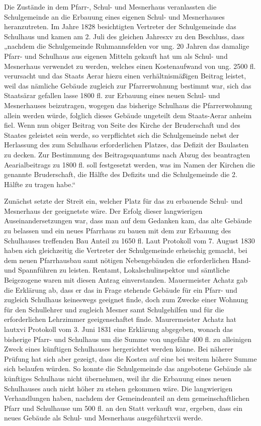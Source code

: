 \documentclass[12pt,a4paper]{book}
\begin{document}
Die Zustände in dem Pfarr-, Schul- und Mesnerhaus veranlassten die Schulgemeinde
an die Erbauung eines eigenen Schul- und Mesnerhauses heranzutreten. Im Jahre
1828 besichtigten Vertreter der Schulgemeinde das Schulhaus und kamen am 2. Juli
des gleichen Jahresxv zu den Beschluss, dass „nachdem die Schulgemeinde
Ruhmannsfelden vor ung. 20 Jahren das damalige Pfarr- und Schulhaus aus eigenen
Mitteln gekauft hat um als Schul- und Mesnerhaus verwendet zu werden, welches
einen Kostenaufwand von ung. 2500 fl. verursacht und das Staats Aerar hiezu
einen verhältnismäßigen Beitrag leistet, weil das nämliche Gebäude zugleich zur
Pfarrerwohnung bestimmt war, sich das Staatsärar gefallen lasse 1800 fl. zur
Erbauung eines neuen Schul- und Mesnerhauses beizutragen, wogegen das bisherige
Schulhaus die Pfarrerwohnung allein werden würde, folglich dieses Gebäude
ungeteilt dem Staats-Aerar anheim fiel. Wenn nun obiger Beitrag von Seite des
Kirche der Bruderschaft und des Staates geleistet sein werde, so verpflichtet
sich die Schulgemeinde nebst der Herlassung des zum Schulhaus erforderlichen
Platzes, das Defizit der Baulasten zu decken. Zur Bestimmung des
Beitragsquantums nach Abzug des beantragten Aearialbeitrags zu 1800 fl. soll
festgesetzt werden, was im Namen der Kirchen die genannte Bruderschaft, die
Hälfte des Defizits und die Schulgemeinde die 2. Hälfte zu tragen habe.“

Zunächst setzte der Streit ein, welcher Platz für das zu erbauende Schul- und
Mesnerhaus der geeignetste wäre. Der Erfolg dieser langwierigen
Auseinandersetzungen war, dass man auf dem Gedanken kam, das alte Gebäude zu
belassen und ein neues Pfarrhaus zu bauen mit dem zur Erbauung des Schulhauses
treffenden Bau Anteil zu 1650 fl. Laut Protokoll vom 7. August 1830 haben sich
gleichzeitig die Vertreter der Schulgemeinde erheischig gemacht, bei dem neuen
Pfarrhausbau samt nötigen Nebengebäuden die erforderlichen Hand- und Spannführen
zu leisten. Rentamt, Lokalschulinspektor und sämtliche Beigezogene waren mit
diesen Antrag einverstanden. Mauermeister Achatz gab die Erklärung ab, dass er
das in Frage stehende Gebäude für ein Pfarr- und zugleich Schulhaus keineswegs
geeignet finde, doch zum Zwecke einer Wohnung für den Schullehrer und zugleich
Mesner samt Schulgehilfen und für die erforderlichen Lehrzimmer geeigenschaftet
finde. Maurermeister Achatz hat lautxvi Protokoll vom 3. Juni 1831 eine
Erklärung abgegeben, wonach das bisherige Pfarr- und Schulhaus um die Summe von
ungefähr 400 fl. zu alleinigen Zweck eines künftigen Schulhauses hergerichtet
werden könne. Bei näherer Prüfung hat sich aber gezeigt, dass die Kosten auf
eine bei weitem höhere Summe sich belaufen würden. So konnte die Schulgemeinde
das angebotene Gebäude als künftiges Schulhaus nicht übernehmen, weil ihr die
Erbauung eines neuen Schulhauses auch nicht höher zu stehen gekommen wäre. Die
langwierigen Verhandlungen haben, nachdem der Gemeindeanteil an dem
gemeinschaftlichen Pfarr und Schulhause um 500 fl. an den Statt verkauft war,
ergeben, dass ein neues Gebäude als Schul- und Mesnerhaus ausgeführtxvii werde.
\end{document}
